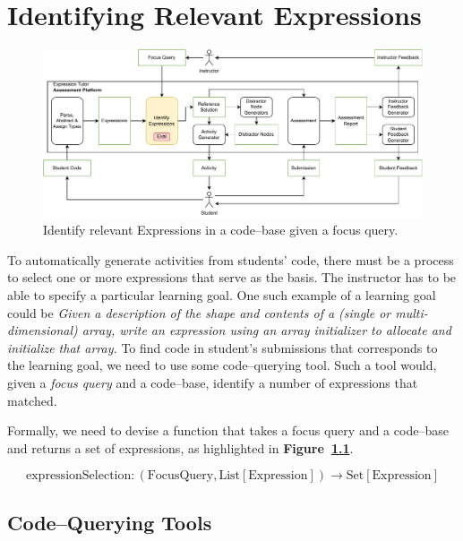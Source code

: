 \chapter{Identifying Relevant Expressions}\label{sec:etl}

\begin{chapterBody}

\begin{figure}[ht]
    \centering
    \includegraphics[width=\textwidth]{res/4/et_loop_etl.pdf}
    \caption{Identify relevant Expressions in a code–base given a focus query.}
    \label{fig:etl-intro-loop}
\end{figure}

To automatically generate activities from students' code, there must
be a process to select one or more expressions that serve as the basis.
The instructor has to be able to specify a particular learning goal.
One such example of a learning goal could be \textit{Given a description of
the shape and contents of a (single or multi-dimensional) array, write an
expression using an array initializer to allocate and initialize that array.}
To find code in student's submissions that corresponds to the learning
goal, we need to use some code–querying tool. Such a tool would, given
a \textit{focus query} and a code–base, identify a number of expressions
that matched.

Formally, we need to devise a function that takes a focus query and a
code–base and returns a set of expressions, as highlighted in
\textbf{Figure~\ref{fig:etl-intro-loop}}.

\[
\text{expressionSelection}:
\left(\text{FocusQuery}, \text{List}[\text{Expression}]\right)
\rightarrow
\text{Set}\left[\text{Expression}\right]
\]

\section{Code–Querying Tools}


\end{chapterBody}
